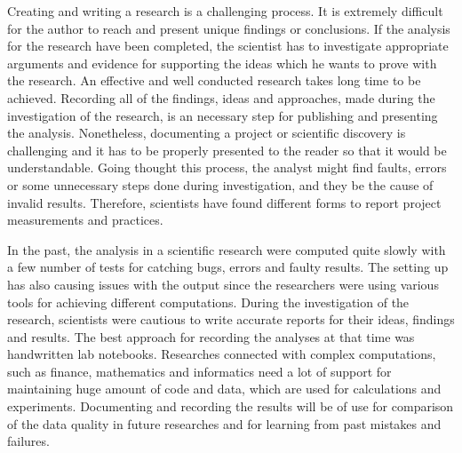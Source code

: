Creating and writing a research is a challenging process. It is extremely difficult for the author to reach and present unique findings or conclusions. If the analysis for the research have been completed, the scientist has to investigate appropriate arguments and evidence for supporting the ideas which he wants to prove with the research. An effective and well conducted research takes long time to be achieved. Recording all of the findings, ideas and approaches, made during the investigation of the research, is an necessary step for publishing and presenting the analysis. Nonetheless, documenting a project or scientific discovery is challenging and it has to be properly presented to the reader so that it would be understandable. Going thought this process, the analyst might find faults, errors or some unnecessary steps done during investigation, and they be the cause of invalid results. Therefore, scientists have found different forms to report project measurements and practices.\cite{holmes2003reworking}

In the past, the analysis in a scientific research were computed quite slowly with a few number of tests for catching bugs, errors and faulty results. The setting up has also causing issues with the output since the researchers were using various tools for achieving different computations. During the investigation of the research, scientists were cautious to write accurate reports for their ideas, findings and results. The best approach for recording the analyses at that time was handwritten lab notebooks. Researches connected with complex computations, such as finance, mathematics and informatics need a lot of support for maintaining huge amount of code and data, which are used for calculations and experiments. Documenting and recording the results will be of use for comparison of the data quality in future researches and for learning from past mistakes and failures.\cite{guo2012burrito}

